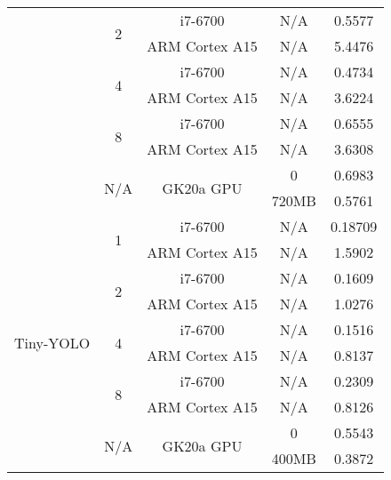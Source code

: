 \begin{table}[H]
\begin{center}
\begin{tabular}[center]{ | c | c | c | c | c | }
                                & \multirow{2}{*}{2}    & i7-6700 & N/A & 0.5577 \\ \cline{3-5}
                                &                       & ARM Cortex A15 & N/A & 5.4476 \\ \cline{2-5}
                                & \multirow{2}{*}{4}    & i7-6700 & N/A & 0.4734 \\ \cline{3-5}
                                &                       & ARM Cortex A15 & N/A & 3.6224 \\ \cline{2-5}
                                & \multirow{2}{*}{8}    & i7-6700 & N/A & 0.6555 \\ \cline{3-5}
                                &                       & ARM Cortex A15 & N/A & 3.6308 \\ \cline{2-5}
                                & \multirow{2}{*}{N/A}  & \multirow{2}{*}{GK20a GPU} & 0 & 0.6983 \\ \cline{4-5}
                                &                       &                            & 720MB & 0.5761 \\ \hline
      \multirow{10}{*}{Tiny-YOLO} & \multirow{2}{*}{1}    & i7-6700 & N/A & 0.18709 \\ \cline{3-5}
                                  &                       & ARM Cortex A15 & N/A & 1.5902 \\ \cline{2-5}
                                  & \multirow{2}{*}{2}    & i7-6700 & N/A & 0.1609 \\ \cline{3-5}
                                  &                       & ARM Cortex A15 & N/A & 1.0276 \\ \cline{2-5}
                                  & \multirow{2}{*}{4}    & i7-6700 & N/A & 0.1516 \\ \cline{3-5}
                                  &                       & ARM Cortex A15 & N/A & 0.8137 \\ \cline{2-5}
                                  & \multirow{2}{*}{8}    & i7-6700 & N/A & 0.2309 \\ \cline{3-5}
                                  &                       & ARM Cortex A15 & N/A & 0.8126 \\ \cline{2-5}
                                  & \multirow{2}{*}{N/A}  & \multirow{2}{*}{GK20a GPU} & 0 & 0.5543 \\ \cline{4-5}
                                  &                       &                            & 400MB & 0.3872 \\
      \hline
    \end{tabular}
  \end{center}
\end{table}

